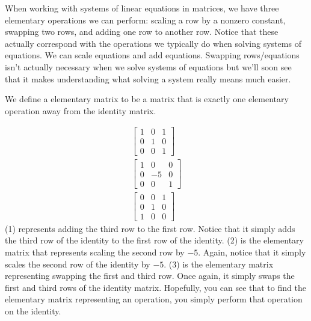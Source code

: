 When working with systems of linear equations in matrices, we have three elementary operations we can perform: scaling a row by a nonzero constant, swapping two rows, and adding one row to another row. Notice that these actually correspond with the operations we typically do when solving systems of equations. We can scale equations and add equations. Swapping rows/equations isn't actually necessary when we solve systems of equations but we'll soon see that it makes understanding what solving a system really means much easier.
\begin{definition}
    We define a elementary matrix to be a matrix that is exactly one elementary operation away from the identity matrix.
\end{definition}
\begin{example}
    \begin{align*}
        \begin{bmatrix}
            1 & 0 & 1 \\
            0 & 1 & 0 \\
            0 & 0 & 1
        \end{bmatrix}\tag{1}\\
        \begin{bmatrix}
            1 & 0 & 0 \\
            0 & -5 & 0 \\
            0 & 0 & 1
        \end{bmatrix}\tag{2}\\
        \begin{bmatrix}
            0 & 0 & 1\\
            0 & 1 & 0\\
            1 & 0 & 0
        \end{bmatrix}\tag{3}
    \end{align*}
    (1) represents adding the third row to the first row. Notice that it simply adds the third row of the identity to the first row of the identity. (2) is the elementary matrix that represents scaling the second row by $-5$. Again, notice that it simply scales the second row of the identity by $-5$. (3) is the elementary matrix representing swapping the first and third row. Once again, it simply swaps the first and third rows of the identity matrix. Hopefully, you can see that to find the elementary matrix representing an operation, you simply perform that operation on the identity.
\end{example}
